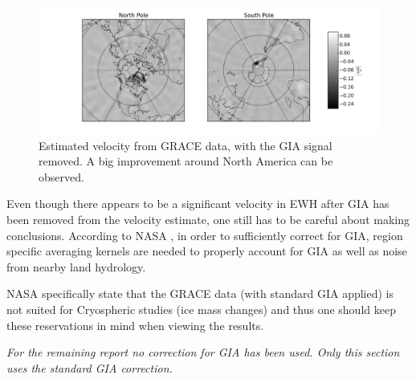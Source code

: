 \begin{figure}[H]
	\centering
	\includegraphics[width=\textwidth]{figures/gia-adjust-vel}
	\caption{Estimated velocity from GRACE data, with the GIA signal removed. A big improvement around North America can be observed.}
	\label{fig:gia-adjust-vel}
\end{figure}

Even though there appears to be a significant velocity in EWH after GIA has been removed from the velocity estimate, one still has to be careful about making conclusions. According to NASA \cite{NASA-GIA-incomplete}, in order to sufficiently correct for GIA, region specific averaging kernels are needed to properly account for GIA as well as noise from nearby land hydrology.

NASA specifically state \cite{NASA-GIA-incomplete} that the GRACE data (with standard GIA applied) is not suited for Cryospheric studies (ice mass changes) and thus one should keep these reservations in mind when viewing the results.

\textit{For the remaining report no correction for GIA has been used. Only this section uses the standard GIA correction.}
